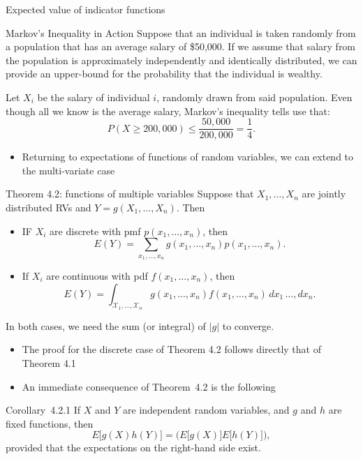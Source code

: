 \begin{frame}[allowframebreaks]{Expected value of indicator functions}
  \framebreak

  \begin{exampleblock}{Markov's Inequality in Action}
    Suppose that an individual is taken randomly from a population that has an average salary of \$50,000. If we assume that salary from the population is approximately independently and identically distributed, we can provide an upper-bound for the probability that the individual is wealthy.
    
    Let $X_i$ be the salary of individual $i$, randomly drawn from said population. Even though all we know is the average salary, Markov's inequality tells use that:
    $$
    P(X \geq 200,000) \leq \frac{50,000}{200,000} = \frac{1}{4}. 
    $$
  \end{exampleblock}

  \framebreak

  \begin{itemize}
    \item Returning to expectations of functions of random variables, we can extend to the multi-variate case
  \end{itemize}
  
  \begin{block}{Theorem 4.2: functions of multiple variables}
    Suppose that $X_1, \ldots, X_n$ are jointly distributed RVs and $Y = g(X_1, \ldots, X_n)$. Then
    \begin{itemize}
      \item IF $X_i$ are discrete with pmf $p(x_1, \ldots, x_n)$, then
      $$
      E(Y) = \sum_{x_1, \ldots, x_n} g(x_1, \ldots, x_n)p(x_1, \ldots, x_n).
      $$
      \item If $X_i$ are continuous with pdf $f(x_1, \ldots, x_n)$, then
      $$
      E(Y) = \int_{\mathcal{X}_1, \ldots, \mathcal{X}_n}g(x_1, \ldots, x_n)f(x_1, \ldots, x_n)\, dx_1\,\ldots,dx_n.
      $$
    \end{itemize}
    In both cases, we need the sum (or integral) of $|g|$ to converge.
  \end{block}

\framebreak

\begin{itemize}
  \item The proof for the discrete case of Theorem 4.2 follows directly that of Theorem 4.1
  \item An immediate consequence of Theorem~4.2 is the following
\end{itemize}

\begin{block}{Corollary~4.2.1}
  If $X$ and $Y$ are independent random variables, and $g$ and $h$ are fixed functions, then
  $$
  E\big[g(X)h(Y)\big] = \Big(E\big[g(X)\big]E\big[h(Y)\big]\Big),
  $$
  provided that the expectations on the right-hand side exist.
\end{block}


\end{frame}

